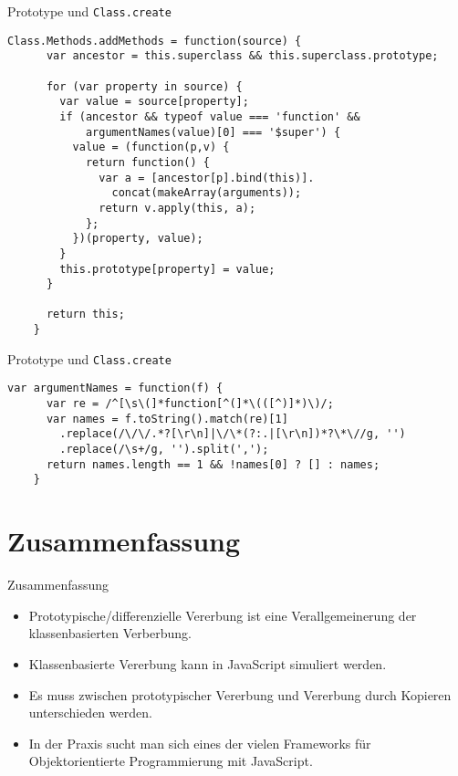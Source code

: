 \begin{frame}[fragile]{Prototype und \texttt{Class.create}}
  \begin{lstlisting}[gobble=4]
    Class.Methods.addMethods = function(source) {
      var ancestor = this.superclass && this.superclass.prototype;
  
      for (var property in source) {
        var value = source[property];
        if (ancestor && typeof value === 'function' &&
            argumentNames(value)[0] === '$super') {
          value = (function(p,v) {
            return function() {
              var a = [ancestor[p].bind(this)].
                concat(makeArray(arguments));
              return v.apply(this, a);
            };
          })(property, value);
        }
        this.prototype[property] = value;
      }
  
      return this;
    }
  \end{lstlisting}
\end{frame}

\begin{frame}[fragile]{Prototype und \texttt{Class.create}}
  \begin{lstlisting}[gobble=4]
    var argumentNames = function(f) {
      var re = /^[\s\(]*function[^(]*\(([^)]*)\)/;
      var names = f.toString().match(re)[1]
        .replace(/\/\/.*?[\r\n]|\/\*(?:.|[\r\n])*?\*\//g, '')
        .replace(/\s+/g, '').split(',');
      return names.length == 1 && !names[0] ? [] : names;
    }
  \end{lstlisting}
\end{frame}

\section*{Zusammenfassung}

\begin{frame}{Zusammenfassung}
  \begin{itemize}
    \item \alert{Prototypische/differenzielle Vererbung} ist eine \alert{Verallgemeinerung} der
      klassenbasierten Verberbung.
    \item \alert{Klassenbasierte Vererbung} kann in JavaScript \alert{simuliert} werden.
    \item Es muss zwischen \alert{prototypischer Vererbung} und \alert{Vererbung durch
      Kopieren} unterschieden werden.
    \item In der Praxis sucht man sich eines der \alert{vielen Frameworks} für
      \alert{Objektorientierte Programmierung mit JavaScript}.
  \end{itemize} 
\end{frame}

